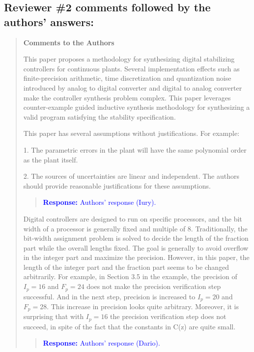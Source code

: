 \documentclass[11pt]{article}
\begin{document}
\subsection*{Reviewer \#2 comments followed by the authors' answers:}
\begin{quote}

{\bf Comments to the Authors}

This paper proposes a methodology for synthesizing digital stabilizing controllers for continuous plants. Several implementation effects such as finite-precision arithmetic, time discretization and quantization noise introduced by analog to digital converter and digital to analog converter make the controller synthesis problem complex. This paper leverages counter-example guided inductive synthesis methodology for synthesizing a valid program satisfying the stability specification.  

This paper has several assumptions without justifications. For example:

1. The parametric errors in the plant will have the same polynomial order as the plant itself.

2. The sources of uncertainties are linear and independent.
The authors should provide reasonable justifications for these assumptions.

\begin{quote}
\textcolor{blue}{\textbf{Response:} Authors' response (Iury).}
\end{quote}

Digital controllers are designed to run on specific processors, and the bit width of a processor is generally fixed and multiple of 8. Traditionally, the bit-width assignment problem is solved to decide the length of the fraction part while the overall lengths fixed. The goal is generally to avoid overflow in the integer part and maximize the precision. However, in this paper, the length of the integer part and the fraction part seems to be changed arbitrarily. For example, in Section 3.5 in the example, the precision of $I_p = 16$ and $F_p = 24$ does not make the precision verification step successful. And in the next step, precision is increased to $I_p = 20$ and $F_p = 28$. This increase in precision looks quite arbitrary. Moreover, it is surprising that with $I_p = 16$ the precision verification step does not succeed, in spite of the fact that the constants in C(z) are quite small.

\begin{quote}
\textcolor{blue}{\textbf{Response:} Authors' response (Dario).}
\end{quote}


\end{quote}
\end{document}
